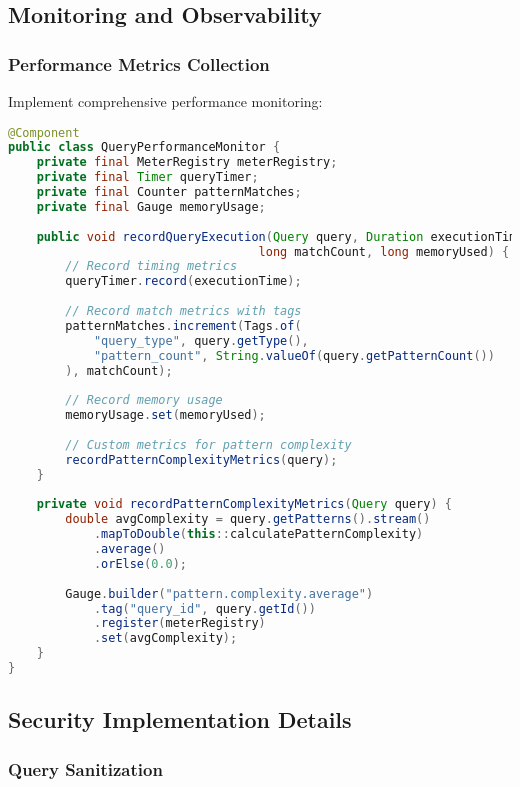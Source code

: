 \documentclass[11pt,a4paper]{article}
\begin{document}
\subsection{Monitoring and Observability}

\subsubsection{Performance Metrics Collection}

Implement comprehensive performance monitoring:

\begin{lstlisting}[language=Java, caption=Performance Monitoring]
@Component
public class QueryPerformanceMonitor {
    private final MeterRegistry meterRegistry;
    private final Timer queryTimer;
    private final Counter patternMatches;
    private final Gauge memoryUsage;
    
    public void recordQueryExecution(Query query, Duration executionTime, 
                                   long matchCount, long memoryUsed) {
        // Record timing metrics
        queryTimer.record(executionTime);
        
        // Record match metrics with tags
        patternMatches.increment(Tags.of(
            "query_type", query.getType(),
            "pattern_count", String.valueOf(query.getPatternCount())
        ), matchCount);
        
        // Record memory usage
        memoryUsage.set(memoryUsed);
        
        // Custom metrics for pattern complexity
        recordPatternComplexityMetrics(query);
    }
    
    private void recordPatternComplexityMetrics(Query query) {
        double avgComplexity = query.getPatterns().stream()
            .mapToDouble(this::calculatePatternComplexity)
            .average()
            .orElse(0.0);
            
        Gauge.builder("pattern.complexity.average")
            .tag("query_id", query.getId())
            .register(meterRegistry)
            .set(avgComplexity);
    }
}
\end{lstlisting}

\subsection{Security Implementation Details}

\subsubsection{Query Sanitization}
\end{document}
